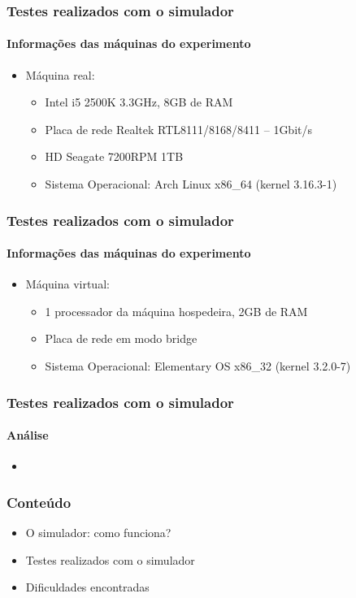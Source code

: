 \documentclass{beamer}
\begin{document}
\begin{frame}
	\frametitle{Testes realizados com o simulador}
	\framesubtitle{Informações das máquinas do experimento}
	\begin{itemize}
		\item Máquina real:
			\begin{itemize}
				\item Intel i5 2500K 3.3GHz, 8GB de RAM
				\item Placa de rede Realtek RTL8111/8168/8411 – 1Gbit/s
				\item HD Seagate 7200RPM 1TB
				\item Sistema Operacional: Arch Linux x86\_64 (kernel 3.16.3-1)
			\end{itemize}
	\end{itemize}
\end{frame}

\begin{frame}
	\frametitle{Testes realizados com o simulador}
	\framesubtitle{Informações das máquinas do experimento}
	\begin{itemize}
		\item Máquina virtual:
			\begin{itemize}
				\item 1 processador da máquina hospedeira, 2GB de RAM
				\item Placa de rede em modo bridge
				\item Sistema Operacional: Elementary OS x86\_32 (kernel 3.2.0-7)
			\end{itemize}
	\end{itemize}
\end{frame}

\begin{frame}
	\frametitle{Testes realizados com o simulador}
	\framesubtitle{Análise}
	\begin{itemize}
		\item 
	\end{itemize}
\end{frame}

\begin{frame}
	\frametitle{Conteúdo}
	\begin{itemize}
		\item \textcolor{covered}{O simulador: como funciona?}
		\item \textcolor{covered}{Testes realizados com o simulador}
		\item Dificuldades encontradas
	\end{itemize}
\end{frame}
\end{document}
